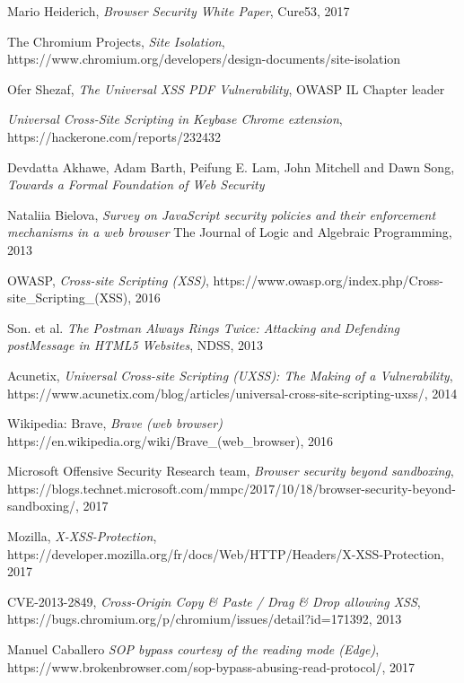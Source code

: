 \documentclass[journal]{IEEEtran}
\begin{document}
\begin{thebibliography}{1}
 
Mario Heiderich,
\textit{Browser Security White Paper},
Cure53, 2017

The Chromium Projects,
\textit{Site Isolation},
https://www.chromium.org/developers/design-documents/site-isolation

Ofer Shezaf,
\textit{The Universal XSS PDF Vulnerability},
OWASP IL Chapter leader

\textit{Universal Cross-Site Scripting in Keybase Chrome extension},
https://hackerone.com/reports/232432
 
Devdatta Akhawe, Adam Barth, Peifung E. Lam, John Mitchell and Dawn Song,
\textit{Towards a Formal Foundation of Web Security}
 
Nataliia Bielova,
\textit{Survey on JavaScript security policies and their enforcement mechanisms in a web browser}
The Journal of Logic and Algebraic Programming, 2013

OWASP,
\textit{Cross-site Scripting (XSS)},
https://www.owasp.org/index.php/Cross-site\_Scripting\_(XSS),
2016

Son. et al. 
\textit{The Postman Always Rings Twice: Attacking and Defending postMessage in HTML5 Websites}, 
NDSS, 2013

Acunetix,
\textit{Universal Cross-site Scripting (UXSS): The Making of a Vulnerability},
https://www.acunetix.com/blog/articles/universal-cross-site-scripting-uxss/,
2014

Wikipedia: Brave,
\textit{Brave (web browser)}
https://en.wikipedia.org/wiki/Brave\_(web\_browser),
2016

Microsoft Offensive Security Research team,
\textit{Browser security beyond sandboxing},
https://blogs.technet.microsoft.com/mmpc/2017/10/18/browser-security-beyond-sandboxing/,
2017

Mozilla,
\textit{X-XSS-Protection},
https://developer.mozilla.org/fr/docs/Web/HTTP/Headers/X-XSS-Protection,
2017

CVE-2013-2849,
\textit{Cross-Origin Copy \& Paste / Drag \& Drop allowing XSS},
https://bugs.chromium.org/p/chromium/issues/detail?id=171392,
2013

Manuel Caballero
\textit{SOP bypass courtesy of the reading mode (Edge)},
https://www.brokenbrowser.com/sop-bypass-abusing-read-protocol/,
2017


\end{thebibliography}
\end{document}
